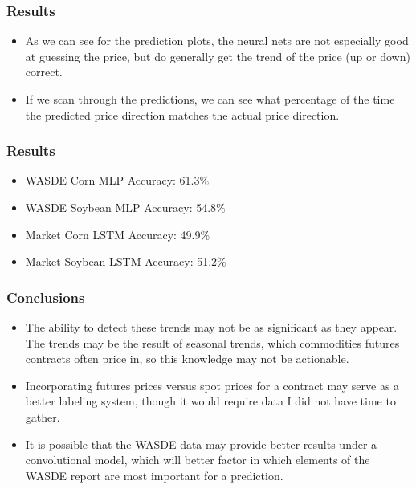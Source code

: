\documentclass{beamer}
\begin{document}
\begin{frame}
\frametitle{Results}
\begin{itemize}
\item As we can see for the prediction plots, the neural nets are not especially good at guessing the price, but do generally get the trend of the price (up or down) correct. 
\item If we scan through the predictions, we can see what percentage of the time the predicted price direction matches the actual price direction.
\end{itemize}
\end{frame}

\begin{frame}
\frametitle{Results}
\begin{itemize}
\item WASDE Corn MLP Accuracy: 61.3\%
\item WASDE Soybean MLP Accuracy: 54.8\%
\item Market Corn LSTM Accuracy: 49.9\%
\item Market Soybean LSTM Accuracy: 51.2\%

\end{itemize}
\end{frame}




\begin{frame}
\frametitle{Conclusions}
\begin{itemize}

\item The ability to detect these trends may not be as significant as they appear.  The trends may be the result of seasonal trends, which commodities futures contracts often price in, so this knowledge may not be actionable.
\item Incorporating futures prices versus spot prices for a contract may serve as a better labeling system, though it would require data I did not have time to gather.
\item It is possible that the WASDE data may provide better results under a convolutional model, which will better factor in which elements of the WASDE report are most important for a prediction.

\end{itemize}

\end{frame}
\end{document}
